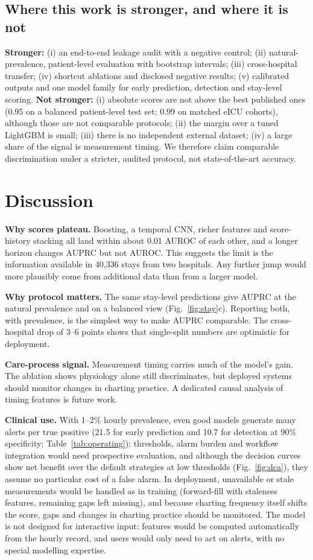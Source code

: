 \documentclass[preprint,12pt]{elsarticle}
\begin{document}
\subsection{Where this work is stronger, and where it is not}
\textbf{Stronger:} (i) an end-to-end leakage audit with a negative control; (ii) natural-prevalence, patient-level evaluation with bootstrap intervals; (iii) cross-hospital transfer; (iv) shortcut ablations and disclosed negative results; (v) calibrated outputs and one model family for early prediction, detection and stay-level scoring. \textbf{Not stronger:} (i) absolute scores are not above the best published ones (0.95 on a balanced patient-level test set; 0.99 on matched eICU cohorts), although those are not comparable protocols; (ii) the margin over a tuned LightGBM is small; (iii) there is no independent external dataset; (iv) a large share of the signal is measurement timing. We therefore claim comparable discrimination under a stricter, audited protocol, not state-of-the-art accuracy.

\section{Discussion}
\textbf{Why scores plateau.} Boosting, a temporal CNN, richer features and score-history stacking all land within about 0.01 AUROC of each other, and a longer horizon changes AUPRC but not AUROC. This suggests the limit is the information available in 40{,}336 stays from two hospitals. Any further jump would more plausibly come from additional data than from a larger model.

\textbf{Why protocol matters.} The same stay-level predictions give AUPRC \AuprcStay{} at the natural prevalence and \BalAuprc{} on a balanced view (Fig.~\ref{fig:stay}c). Reporting both, with prevalence, is the simplest way to make AUPRC comparable. The cross-hospital drop of 3--6 points shows that single-split numbers are optimistic for deployment.

\textbf{Care-process signal.} Measurement timing carries much of the model's gain. The ablation shows physiology alone still discriminates, but deployed systems should monitor changes in charting practice. A dedicated causal analysis of timing features is future work.

\textbf{Clinical use.} With 1--2\% hourly prevalence, even good models generate many alerts per true positive (21.5 for early prediction and 10.7 for detection at 90\% specificity; Table~\ref{tab:operating}); thresholds, alarm burden and workflow integration would need prospective evaluation, and although the decision curves show net benefit over the default strategies at low thresholds (Fig.~\ref{fig:dca}), they assume no particular cost of a false alarm. In deployment, unavailable or stale measurements would be handled as in training (forward-fill with staleness features, remaining gaps left missing), and because charting frequency itself shifts the score, gaps and changes in charting practice should be monitored. The model is not designed for interactive input: features would be computed automatically from the hourly record, and users would only need to act on alerts, with no special modelling expertise.
\end{document}
